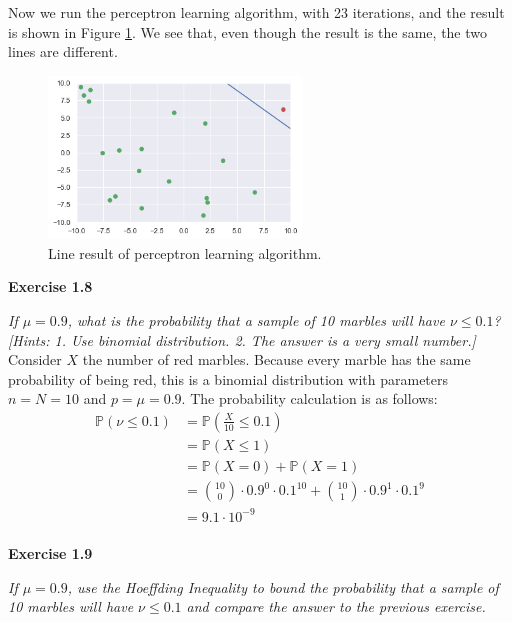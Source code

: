 \documentclass{article}
\newcommand{\prob}{\mathbb{P}}
\begin{document}
    Now we run the perceptron learning algorithm, with 23 iterations, and the result is shown in Figure \ref{fig:pla}.
    We see that, even though the result is the same, the two lines are different.
    
    \begin{figure}[H]
        \centering
        \includegraphics[width=0.6\textwidth]{exercise_1.4_3.png}
        \caption{Line result of perceptron learning algorithm.}
        \label{fig:pla}
    \end{figure}

    \bigskip

    \noindent \textbf{Exercise 1.8}

    \noindent \textit{If $\mu = 0.9$, what is the probability that a sample of 10 marbles will have $\nu \le 0.1$? [Hints: 1. Use binomial distribution. 2. The answer is a very small number.]} \\

    Consider $X$ the number of red marbles.
    Because every marble has the same probability of being red, this is a binomial distribution with parameters $n = N = 10$ and $p = \mu = 0.9$.
    The probability calculation is as follows:
    \begin{align*}
        \prob(\nu \le 0.1) &= \prob\left(\frac{X}{10} \le 0.1\right) \\
        &= \prob(X \le 1) \\
        &= \prob(X = 0) + \prob(X = 1) \\
        &= {10 \choose 0} \cdot 0.9^0 \cdot 0.1^{10} + {10 \choose 1} \cdot 0.9^1 \cdot 0.1^9 \\
        &= 9.1 \cdot 10^{-9}
    \end{align*} \\

    \noindent \textbf{Exercise 1.9}

    \noindent \textit{If $\mu = 0.9$, use the Hoeffding Inequality to bound the probability that a sample of 10 marbles will have $\nu \le 0.1$ and compare the answer to the previous exercise.} \\
\end{document}
